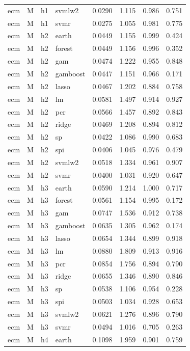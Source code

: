 \begin{ThreePartTable}
\begin{longtable}[t]{llclcccc}
ecm & M & h1 & svmlw2 & 0.0290 & 1.115 & 0.986 & 0.751\\
ecm & M & h1 & svmr & 0.0275 & 1.055 & 0.981 & 0.775\\
\addlinespace
ecm & M & h2 & earth & 0.0449 & 1.155 & 0.999 & 0.424\\
ecm & M & h2 & forest & 0.0449 & 1.156 & 0.996 & 0.352\\
ecm & M & h2 & gam & 0.0474 & 1.222 & 0.955 & 0.848\\
ecm & M & h2 & gamboost & 0.0447 & 1.151 & 0.966 & 0.171\\
ecm & M & h2 & lasso & 0.0467 & 1.202 & 0.884 & 0.758\\
ecm & M & h2 & lm & 0.0581 & 1.497 & 0.914 & 0.927\\
ecm & M & h2 & pcr & 0.0566 & 1.457 & 0.892 & 0.843\\
ecm & M & h2 & ridge & 0.0469 & 1.208 & 0.894 & 0.812\\
ecm & M & h2 & sp & 0.0422 & 1.086 & 0.990 & 0.683\\
ecm & M & h2 & spi & 0.0406 & 1.045 & 0.976 & 0.479\\
ecm & M & h2 & svmlw2 & 0.0518 & 1.334 & 0.961 & 0.907\\
ecm & M & h2 & svmr & 0.0400 & 1.031 & 0.920 & 0.647\\
\addlinespace
ecm & M & h3 & earth & 0.0590 & 1.214 & 1.000 & 0.717\\
ecm & M & h3 & forest & 0.0561 & 1.154 & 0.995 & 0.172\\
ecm & M & h3 & gam & 0.0747 & 1.536 & 0.912 & 0.738\\
ecm & M & h3 & gamboost & 0.0635 & 1.305 & 0.962 & 0.174\\
ecm & M & h3 & lasso & 0.0654 & 1.344 & 0.899 & 0.918\\
ecm & M & h3 & lm & 0.0880 & 1.809 & 0.913 & 0.916\\
ecm & M & h3 & pcr & 0.0854 & 1.756 & 0.894 & 0.790\\
ecm & M & h3 & ridge & 0.0655 & 1.346 & 0.890 & 0.846\\
ecm & M & h3 & sp & 0.0538 & 1.106 & 0.954 & 0.228\\
ecm & M & h3 & spi & 0.0503 & 1.034 & 0.928 & 0.653\\
ecm & M & h3 & svmlw2 & 0.0621 & 1.276 & 0.896 & 0.790\\
ecm & M & h3 & svmr & 0.0494 & 1.016 & 0.705 & 0.263\\
\addlinespace
ecm & M & h4 & earth & 0.1098 & 1.959 & 0.901 & 0.759\\

\end{longtable}
\end{ThreePartTable}
